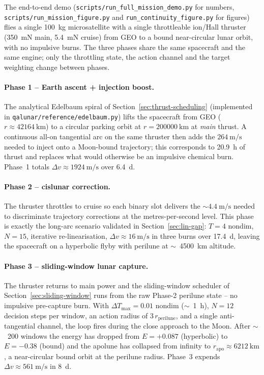 \documentclass[8pt,a4paper]{article}
\theoremstyle{definition}
\theoremstyle{remark}
\begin{document}
The end-to-end demo
(\texttt{scripts/run\_full\_mission\_demo.py} for numbers,
\texttt{scripts/run\_mission\_figure.py} and
\texttt{run\_continuity\_figure.py} for figures) flies a single
\SI{100}{\kg} microsatellite with a single throttleable ion/Hall
thruster (\SI{350}{\milli\newton} main, \SI{5.4}{\milli\newton}
cruise) from GEO to a bound near-circular lunar orbit, with no
impulsive burns. The three phases share the same spacecraft and
the same engine; only the throttling state, the action channel
and the target weighting change between phases.

\paragraph{Phase 1 -- Earth ascent + injection boost.} The
analytical Edelbaum spiral of
Section~\ref{sec:thrust-scheduling} (implemented in
\texttt{qalunar/reference/edelbaum.py}) lifts the spacecraft from
GEO ($r \approx \SI{42164}{\km}$) to a circular parking orbit at
$r = \SI{200000}{\km}$ at \emph{main} thrust. A continuous
all-on tangential arc on the same thruster then adds the
$\SI{264}{\meter\per\second}$ needed to inject onto a Moon-bound
trajectory; this corresponds to \SI{20.9}{\hour} of thrust and
replaces what would otherwise be an impulsive chemical burn.
Phase~1 totals $\Delta v \approx \SI{1924}{\meter\per\second}$
over \SI{6.4}{\day}.

\paragraph{Phase 2 -- cislunar correction.} The thruster throttles
to cruise so each binary slot delivers the
$\sim \SI{4.4}{\meter\per\second}$ needed to discriminate
trajectory corrections at the metres-per-second level. This phase
is exactly the long-arc scenario validated in
Section~\ref{sec:lin-gap}: $T = 4$ nondim, $N = 15$, iterative
re-linearisation, $\Delta v \approx \SI{16}{\meter\per\second}$
in three burns over \SI{17.4}{\day}, leaving the spacecraft on a
hyperbolic flyby with perilune at $\sim$~\SI{4500}{\km} altitude.

\paragraph{Phase 3 -- sliding-window lunar capture.} The thruster
returns to main power and the sliding-window scheduler of
Section~\ref{sec:sliding-window} runs from the raw Phase-2
perilune state -- no impulsive pre-capture burn. With
$\Delta T_\mathrm{max} = 0.01$ nondim ($\sim$~\SI{1}{\hour}),
$N = 12$ decision steps per window, an action radius of
$3\,r_\mathrm{perilune}$, and a single anti-tangential channel,
the loop fires during the close approach to the Moon. After
$\sim$~\num{200} windows the energy has dropped from $E = +0.087$
(hyperbolic) to $E = -0.38$ (bound) and the apolune has collapsed
from infinity to $r_\mathrm{apo} \approx \SI{6212}{\km}$, a
near-circular bound orbit at the perilune radius. Phase~3 expends
$\Delta v \approx \SI{561}{\meter\per\second}$ in \SI{8}{\day}.
\end{document}
